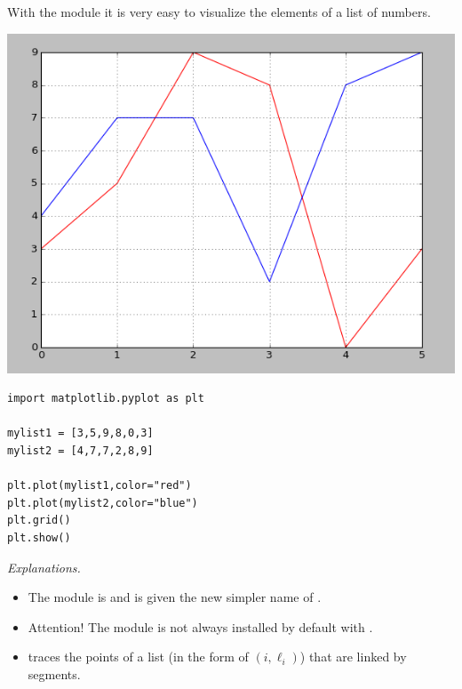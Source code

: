 \documentclass[11pt,class=report,crop=false]{standalone}
\begin{document}

\begin{cours}

With the  module it is very easy to visualize the elements of a list of numbers.


\begin{center}
\includegraphics[scale=\myscale,scale=0.45]{screen-lists-lesson-visualization}
\end{center}

\begin{lstlisting}
import matplotlib.pyplot as plt

mylist1 = [3,5,9,8,0,3]
mylist2 = [4,7,7,2,8,9]

plt.plot(mylist1,color="red")
plt.plot(mylist2,color="blue")
plt.grid()
plt.show()
\end{lstlisting}


\emph{Explanations.}
\begin{itemize}
  \item The module is  and is given the new simpler name of .
  
  \item Attention! The  module is not always installed by default with \Python.
  
  \item {} traces the points of a list (in the form of $(i,\ell_i)$) that are linked by segments.
  

\end{itemize}
\end{cours}
\end{document}
